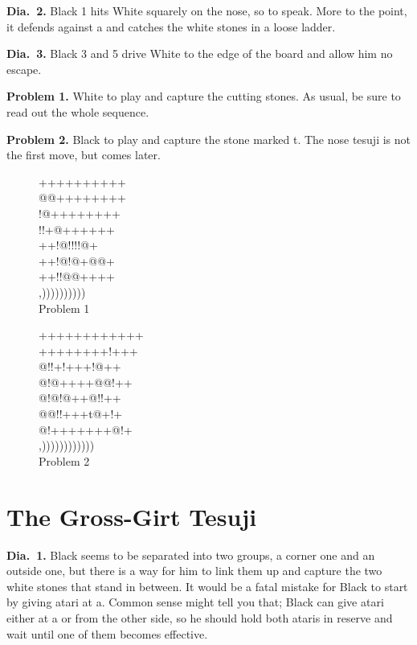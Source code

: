 \documentclass[mcrownvopaper,10pt,oneside,onecolumn,draft,showtrims]{memoir}
\begin{document}
\noindent
\textbf{Dia.\ 2.} Black 1 hits White squarely on the nose, so to speak. More to the
point, it defends against a and catches the white stones in a loose ladder.

\noindent
\textbf{Dia.\ 3.} Black 3 and 5 drive White to the edge of the board and allow
him no escape.

\noindent
\textbf{Problem 1.} White to play and capture the cutting stones. As usual, be
sure to read out the whole sequence.

\noindent
\textbf{Problem 2.} Black to play and capture the stone marked {\gnos t}. The nose
tesuji is not the first move, but comes later.
\begin{figure}[ht]
    \begin{minipage}[c]{0.45\linewidth}
        \centering    
        {\gnos%
        ++++++++++\\
        @@++++++++\\
        !@++++++++\\
        !!+@++++++\\
        ++!@!!!!@+\\
        ++!@!@+@@+\\
        ++!!@@++++\\
        ,))))))))))\\
        }
        Problem 1
    \end{minipage}%
    \begin{minipage}[c]{0.55\linewidth}
        \centering    
        {\gnos%
        ++++++++++++\\
        ++++++++!+++\\
        @!!+!+++!@++\\
        @!@++++@@!++\\
        @!@!@++@!!++\\
        @@!!+++t@+!+\\
        @!+++++++@!+\\
        ,))))))))))))\\
        }
        Problem 2
    \end{minipage}%
\end{figure}
\section{The Gross-Girt Tesuji}

\noindent
\textbf{Dia.\ 1.} Black seems to be separated into two groups, a corner one and
an outside one, but there is a way for him to link them up and capture
the two white stones that stand in between.
It would be a fatal mistake for Black to start by giving atari at a.
Common sense might tell you that; Black can give atari either at a or
from the other side, so he should hold both ataris in reserve and wait
until one of them becomes effective.
\end{document}
